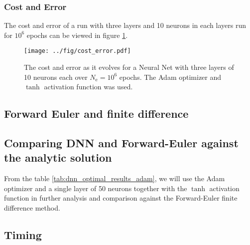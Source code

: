 \subsubsection{Cost and Error} 
The cost and error of a run with three layers and 10 neurons in each layers run for $10^6$ epochs can be viewed in figure \ref{fig:cost-error}.
\begin{figure}
    \centering
    \texttt{[image: ../fig/cost\_error.pdf]}
    \caption{The cost and error as it evolves for a Neural Net with three layers of 10 neurons each over $N_\mathrm{e}=10^6$ epochs. The Adam optimizer and $\tanh$ activation function was used.}
    \label{fig:cost-error}
\end{figure}

\subsection{Forward Euler and finite difference}


\subsection{Comparing DNN and Forward-Euler against the analytic solution}
From the table \ref{tab:dnn_optimal_results_adam}, we will use the Adam optimizer and a single layer of 50 neurons together with the $\tanh$ activation function in further analysis and comparison against the Forward-Euler finite difference method.

\subsection{Timing}
